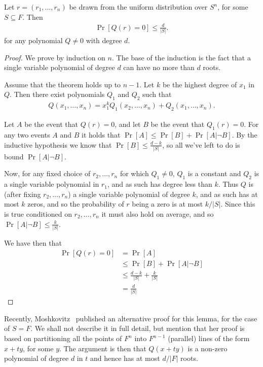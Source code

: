 \documentclass{article}
\begin{document}
\begin{lemma}
  Let $r = (r_1, \ldots, r_n)$ be drawn from the uniform distribution
  over $S^n$, for some $S \subseteq F$. Then
  \begin{align*}
    \Pr[Q(r) = 0] \leq \frac{d}{|S|}.
  \end{align*}
  for any polynomial $Q \neq 0$ with degree $d$.
\end{lemma}
\begin{proof}
  We prove by induction on $n$. The base of the induction is the fact
  that a single variable polynomial of degree $d$ can have no more
  than $d$ roots.

  Assume that the theorem holds up to $n-1$. Let $k$ be the highest
  degree of $x_1$ in $Q$. Then there exist polynomials $Q_1$ and $Q_2$
  such that
  \begin{align*}
    Q(x_1, \ldots, x_n) = x_1^kQ_1(x_2, \ldots, x_n) + Q_2(x_1, \ldots, x_n).
  \end{align*}

  Let $A$ be the event that $Q(r) = 0$, and let $B$ be the event that
  $Q_1(r) = 0$. For any two events $A$ and $B$ it holds that $\Pr[A]
  \leq \Pr[B] + \Pr[A| \neg B]$. By the inductive hypothesis we know
  that $\Pr[B] \leq \frac{d-k}{|S|}$, so all we've left to do is bound
  $\Pr[A | \neg B]$.
  
  Now, for any fixed choice of $r_2, \ldots, r_n$ for which $Q_1 \neq
  0$, $Q_1$ is a constant and $Q_2$ is a single variable polynomial in
  $r_1$, and as such has degree less than $k$. Thus $Q$ is (after
  fixing $r_2, \ldots, r_n$) a single variable polynomial of degree
  $k$, and as such has at most $k$ zeros, and so the probability of
  $r$ being a zero is at most $k/|S|$. Since this is true conditioned on
  $r_2, \ldots, r_n$ it must also hold on average, and so $\Pr[A |
  \neg B] \leq \frac{k}{|S|}$.

  We have then that
  \begin{align*}
    \Pr[Q(r) = 0] &= \Pr[A]
    \\ &\leq \Pr[B] + \Pr[A| \neg B]
    \\ &\leq \frac{d-k}{|S|} + \frac{k}{|S|}
    \\ &= \frac{d}{|S|}
  \end{align*}
\end{proof}

Recently, Moshkovitz~\cite{Moshkovitz:2010} published an alternative
proof for this lemma, for the case of $S=F$. We shall not describe it
in full detail, but mention that her proof is based on partitioning
all the points of $F^n$ into $F^{n-1}$ (parallel) lines of the form
$x+ty$, for some $y$. The argument is then that $Q(x+ty)$ is a
non-zero polynomial of degree $d$ in $t$ and hence has at most $d/|F|$
roots.
\end{document}
